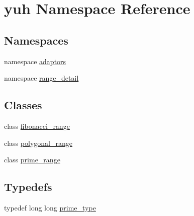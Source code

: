\hypertarget{namespaceyuh}{\section{yuh \-Namespace \-Reference}
\label{d5/d2b/namespaceyuh}
}
\subsection*{\-Namespaces}
\begin{DoxyCompactItemize}
\item 
namespace \hyperlink{namespaceyuh_1_1adaptors}{adaptors}
\item 
namespace \hyperlink{namespaceyuh_1_1range__detail}{range\-\_\-detail}
\end{DoxyCompactItemize}
\subsection*{\-Classes}
\begin{DoxyCompactItemize}
\item 
class \hyperlink{classyuh_1_1fibonacci__range}{fibonacci\-\_\-range}
\item 
class \hyperlink{classyuh_1_1polygonal__range}{polygonal\-\_\-range}
\item 
class \hyperlink{classyuh_1_1prime__range}{prime\-\_\-range}
\end{DoxyCompactItemize}
\subsection*{\-Typedefs}
\begin{DoxyCompactItemize}
\item 
typedef long long \hyperlink{namespaceyuh_af542f8440602da42322ddb7ea8242336}{prime\-\_\-type}
\end{DoxyCompactItemize}
